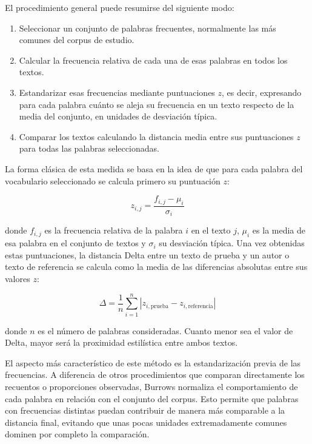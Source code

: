 \documentclass[IB]{TFUOC}%
\begin{document}
El procedimiento general puede resumirse del siguiente modo:

\begin{enumerate}
    \item Seleccionar un conjunto de palabras frecuentes, normalmente las más comunes del corpus de estudio.
    \item Calcular la frecuencia relativa de cada una de esas palabras en todos los textos.
    \item Estandarizar esas frecuencias mediante puntuaciones $z$, es decir, expresando para cada palabra cuánto se aleja su frecuencia en un texto respecto de la media del conjunto, en unidades de desviación típica.
    \item Comparar los textos calculando la distancia media entre sus puntuaciones $z$ para todas las palabras seleccionadas.
\end{enumerate}

La forma clásica de esta medida se basa en la idea de que para cada palabra del vocabulario seleccionado se calcula primero su puntuación $z$:

\begin{equation}
    z_{i,j} = \frac{f_{i,j} - \mu_i}{\sigma_i}
\end{equation}

donde $f_{i,j}$ es la frecuencia relativa de la palabra $i$ en el texto $j$, $\mu_i$ es la media de esa palabra en el conjunto de textos y $\sigma_i$ su desviación típica. Una vez obtenidas estas puntuaciones, la distancia Delta entre un texto de prueba y un autor o texto de referencia se calcula como la media de las diferencias absolutas entre sus valores $z$:

\begin{equation}
    \Delta = \frac{1}{n} \sum_{i=1}^{n} |z_{i,\text{prueba}} - z_{i,\text{referencia}}|
\end{equation}

donde $n$ es el número de palabras consideradas. Cuanto menor sea el valor de Delta, mayor será la proximidad estilística entre ambos textos.

El aspecto más característico de este método es la estandarización previa de las frecuencias. A diferencia de otros procedimientos que comparan directamente los recuentos o proporciones observadas, Burrows normaliza el comportamiento de cada palabra en relación con el conjunto del corpus. Esto permite que palabras con frecuencias distintas puedan contribuir de manera más comparable a la distancia final, evitando que unas pocas unidades extremadamente comunes dominen por completo la comparación.
\end{document}
